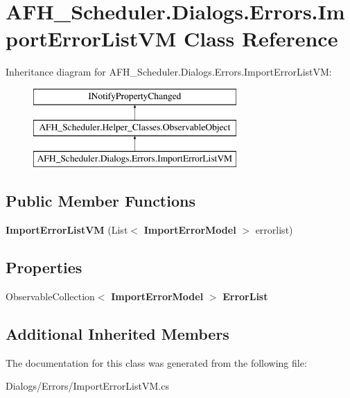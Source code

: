 \section{A\+F\+H\+\_\+\+Scheduler.\+Dialogs.\+Errors.\+Import\+Error\+List\+VM Class Reference}
\label{class_a_f_h___scheduler_1_1_dialogs_1_1_errors_1_1_import_error_list_v_m}
Inheritance diagram for A\+F\+H\+\_\+\+Scheduler.\+Dialogs.\+Errors.\+Import\+Error\+List\+VM\+:\begin{figure}[H]
\begin{center}
\leavevmode
\includegraphics[height=3.000000cm]{class_a_f_h___scheduler_1_1_dialogs_1_1_errors_1_1_import_error_list_v_m}
\end{center}
\end{figure}
\subsection*{Public Member Functions}
\begin{DoxyCompactItemize}
\item 
\mbox{\label{class_a_f_h___scheduler_1_1_dialogs_1_1_errors_1_1_import_error_list_v_m_a5839947fb2b2b5fee35f67fe024f8612}} 
{\bfseries Import\+Error\+List\+VM} (List$<$ \textbf{ Import\+Error\+Model} $>$ errorlist)
\end{DoxyCompactItemize}
\subsection*{Properties}
\begin{DoxyCompactItemize}
\item 
\mbox{\label{class_a_f_h___scheduler_1_1_dialogs_1_1_errors_1_1_import_error_list_v_m_a12f17f1aaff4656a26223890f30d8255}} 
Observable\+Collection$<$ \textbf{ Import\+Error\+Model} $>$ {\bfseries Error\+List}\hspace{0.3cm}{\ttfamily  [get, set]}
\end{DoxyCompactItemize}
\subsection*{Additional Inherited Members}


The documentation for this class was generated from the following file\+:\begin{DoxyCompactItemize}
\item 
Dialogs/\+Errors/Import\+Error\+List\+V\+M.\+cs\end{DoxyCompactItemize}
